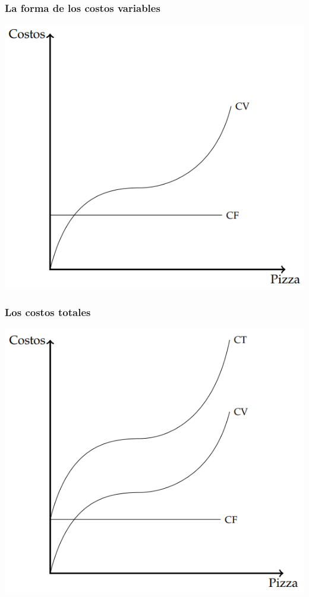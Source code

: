 \documentclass{beamer}
\begin{document}
\begin{frame}
    \frametitle{La forma de los costos variables}
    \centering
    \includegraphics[scale=0.6]{../Figures/C13.2.png}
\end{frame}

\begin{frame}
\frametitle{Los costos totales}
\centering
\includegraphics[scale=0.6]{../Figures/C13.3.png}
\end{frame}
\end{document}
